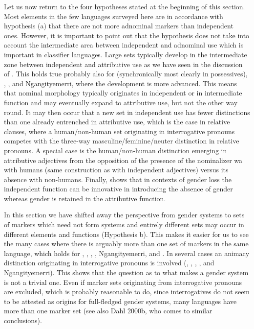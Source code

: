 \documentclass[output=collectionpaper]{langsci/langscibook}
\begin{document}
Let us now return to the four hypotheses stated at the beginning of this section. Most elements in the few languages surveyed here are in accordance with hypothesis (a) that there are not more adnominal markers than independent ones. However, it is important to point out that the hypothesis does not take into account the intermediate area between independent and adnominal use which is important in classifier languages. Large sets typically develop in the intermediate zone between independent and attributive use as we have seen in the discussion of . This holds true probably also for  (synchronically most clearly in possessives), , , and Ngan\textquotesingle{}gityemerri, where the development is more advanced. This means that nominal morphology typically originates in independent or in intermediate function and may eventually expand to attributive use, but not the other way round. It may then occur that a new set in independent use has fewer distinctions than one already entrenched in attributive use, which is the case in  relative clauses, where a human/non-human set originating in interrogative pronouns competes with the three-way masculine/feminine/neuter distinction in relative pronouns. A special case is the  human/non-human distinction emerging in attributive adjectives from the opposition of the presence of the nominalizer wa with humans (same construction as with independent adjectives) versus its absence with non-humans. Finally,  shows that in contexts of gender loss the independent function can be innovative in introducing the absence of gender whereas gender is retained in the attributive function.

In this section we have shifted away the perspective from gender systems to sets of markers which need not form systems and entirely different sets may occur in different elements and functions (Hypothesis b). This makes it easier for us to see the many cases where there is arguably more than one set of markers in the same language, which holds for , , , , Ngan\textquotesingle{}gityemerri, and . In several cases an animacy distinction originating in interrogative pronouns is involved (, , , , and Ngan\textquotesingle{}gityemerri). This shows that the question as to what makes a gender system is not a trivial one. Even if marker sets originating from interrogative pronouns are excluded, which is probably reasonable to do, since interrogatives do not seem to be attested as origins for full-fledged gender systems, many languages have more than one marker set (see also Dahl 2000b, who comes to similar conclusions).
\end{document}
